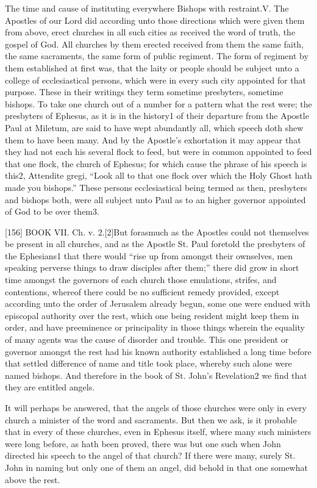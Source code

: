 The time and cause of instituting everywhere Bishops with restraint.V. The Apostles of our Lord did according unto those directions which were given them from above, erect churches in all such cities as received the word of truth, the gospel of God. All churches by them erected received from them the same faith, the same sacraments, the same form of public regiment. The form of regiment by them established at first was, that the laity or people should be subject unto a college of ecclesiastical persons, which were in every such city appointed for that purpose. These in their writings they term sometime presbyters, sometime bishops. To take one church out of a number for a pattern what the rest were; the presbyters of Ephesus, as it is in the history1 of their departure from the Apostle Paul at Miletum, are said to have wept abundantly all, which speech doth shew them to have been many. And by the Apostle’s exhortation it may appear that they had not each his several flock to feed, but were in common appointed to feed that one flock, the church of Ephesus; for which cause the phrase of his speech is this2, Attendite gregi, “Look all to that one flock over which the Holy Ghost hath made you bishops.” These persons ecclesiastical being termed as then, presbyters and bishops both, were all subject unto Paul as to an higher governor appointed of God to be over them3.

[156]
BOOK VII. Ch. v. 2.[2]But forasmuch as the Apostles could not themselves be present in all churches, and as the Apostle St. Paul foretold the presbyters of the Ephesians1 that there would “rise up from amongst their ownselves, men speaking perverse things to draw disciples after them;” there did grow in short time amongst the governors of each church those emulations, strifes, and contentions, whereof there could be no sufficient remedy provided, except according unto the order of Jerusalem already begun, some one were endued with episcopal authority over the rest, which one being resident might keep them in order, and have preeminence or principality in those things wherein the equality of many agents was the cause of disorder and trouble. This one president or governor amongst the rest had his known authority established a long time before that settled difference of name and title took place, whereby such alone were named bishops. And therefore in the book of St. John’s Revelation2 we find that they are entitled angels.

It will perhaps be answered, that the angels of those churches were only in every church a minister of the word and sacraments. But then we ask, is it probable that in every of these churches, even in Ephesus itself, where many such ministers were long before, as hath been proved, there was but one such when John directed his speech to the angel of that church? If there were many, surely St. John in naming but only one of them an angel, did behold in that one somewhat above the rest.

